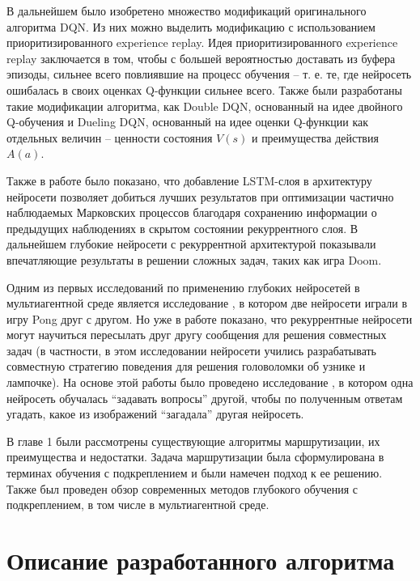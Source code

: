 \documentclass[specification, annotation]{itmo-student-thesis}
\begin{document}
В дальнейшем было изобретено множество модификаций оригинального алгоритма DQN.
Из них можно выделить модификацию с использованием приоритизированного
experience replay\cite{schaul2015prioritized}. Идея приоритизированного
experience replay заключается в том, чтобы с большей вероятностью доставать из
буфера эпизоды, сильнее всего повлиявшие на процесс обучения -- т. е. те,
где нейросеть ошибалась в своих оценках Q-функции сильнее всего.
Также были разработаны такие модификации алгоритма, как Double
DQN\cite{van2016deep}, основанный на идее двойного
Q-обучения\cite{hasselt2010double} и Dueling DQN\cite{wang2015dueling},
основанный на идее оценки Q-функции как отдельных величин -- ценности состояния
$V(s)$ и преимущества действия $A(a)$.

Также в работе \cite{hausknecht2015deep} было показано, что добавление
LSTM-слоя\cite{hochreiter1997long} в архитектуру нейросети позволяет добиться
лучших результатов при оптимизации частично наблюдаемых Марковских процессов
благодаря сохранению информации о предыдущих наблюдениях в скрытом состоянии
рекуррентного слоя. В дальнейшем глубокие нейросети с рекуррентной архитектурой
показывали впечатляющие результаты в решении сложных задач, таких как игра
Doom\cite{lample2016playing}.

Одним из первых исследований по применению глубоких нейросетей в мультиагентной
среде является исследование \cite{tampuu2017multiagent}, в котором две нейросети
играли в игру Pong друг с другом. Но уже в работе \cite{foerster2016learning}
показано, что рекуррентные нейросети могут научиться пересылать друг другу сообщения для решения
совместных задач (в частности, в этом исследовании нейросети учились
разрабатывать совместную стратегию поведения для решения головоломки об узнике и
лампочке). На основе этой работы было проведено исследование
\cite{jorge2016learning}, в котором одна нейросеть обучалась
``задавать вопросы'' другой, чтобы по полученным ответам угадать, какое из
изображений ``загадала'' другая нейросеть.

\chapterconclusion

В главе 1 были рассмотрены существующие алгоритмы маршрутизации, их преимущества
и недостатки. Задача маршрутизации была сформулирована в терминах обучения с
подкреплением и были намечен подход к ее решению. Также был проведен обзор
современных методов глубокого обучения с подкреплением, в том числе в
мультиагентной среде.

\finishrelatedwork

\chapter{Описание разработанного алгоритма}
\end{document}
